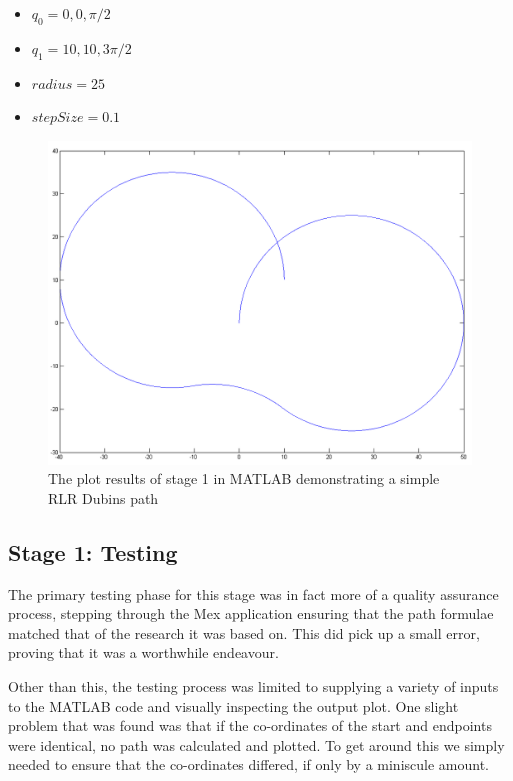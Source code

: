 \begin{itemize}
	\item $q_0 = 0, 0, \pi/2$
	\item $q_1 = 10, 10, 3\pi/2$
	\item $radius = 25$
	\item $stepSize = 0.1$
\end{itemize}


\begin{figure}[htbp!] 
\centering    
\includegraphics[width=\textwidth]{PP1_Demo}
\caption[stage 1: Plotting Dubins Paths in MATLAB]{The plot results of stage 1 in MATLAB demonstrating a simple RLR Dubins path}
\label{fig:pp1demo}
\end{figure}

\subsection{Stage 1: Testing}
\label{task1:stage1:testing}

The primary testing phase for this stage was in fact more of a quality assurance process, stepping through the Mex application ensuring that the path formulae matched that of the research it was based on. This did pick up a small error, proving that it was a worthwhile endeavour. 

Other than this, the testing process was limited to supplying a variety of inputs to the MATLAB code and visually inspecting the output plot. One slight problem that was found was that if the co-ordinates of the start and endpoints were identical, no path was calculated and plotted. To get around this we simply needed to ensure that the co-ordinates differed, if only by a miniscule amount. 


